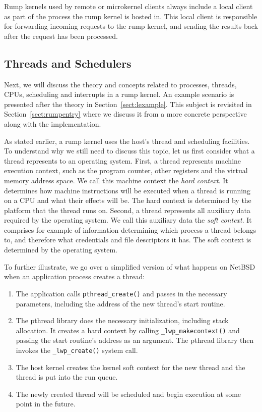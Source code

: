 Rump kernels used by remote or microkernel clients always include
a local client as part of the process the rump kernel is hosted in.
This local client is responsible for forwarding incoming requests to
the rump kernel, and sending the results back after the request has
been processed.


\subsection{Threads and Schedulers}
\label{sect:procmodel}

Next, we will discuss the theory and concepts related to processes,
threads, CPUs, scheduling and interrupts in a rump kernel.  An
example scenario is presented after the theory in
Section~\ref{sect:lexample}.  This subject is revisited in
Section~\ref{sect:rumpentry} where we discuss it from a more concrete
perspective along with the implementation.

As stated earlier, a rump kernel uses the host's thread and
scheduling facilities.  To understand why we still need to discuss
this topic, let us first consider what a thread represents to an
operating system.  First, a thread represents machine execution context,
such as the program counter, other registers and the virtual memory
address space.  We call this machine context the \textit{hard context}.
It determines how machine instructions will be executed when a thread
is running on a CPU and what their effects will be.  The hard context
is determined by the platform that the thread runs on.  Second, a
thread represents all auxiliary data required by the operating system.
We call this auxiliary data the \textit{soft context}.  It comprises
for example of information determining which process a thread belongs
to, and \eg therefore what credentials and file descriptors it has.
The soft context is determined by the operating system.

To further illustrate, we go over a simplified version of what happens
on NetBSD when an application process creates a thread:

\begin{enumerate}
\item   The application calls \verb+pthread_create()+ and passes
	in the necessary parameters, including the address of the new
	thread's start routine.

\item   The pthread library does the necessary initialization, including
	stack allocation.  It creates a hard context
	by calling \verb+_lwp_makecontext()+ and passing the
	start routine's address as an argument.  The pthread library then
	invokes the \verb+_lwp_create()+ system call.

\item   The host kernel creates the kernel soft context for the
	new thread and the thread is put into the run queue.

\item	The newly created thread will be scheduled and begin execution
	at some point in the future.
\end{enumerate}

